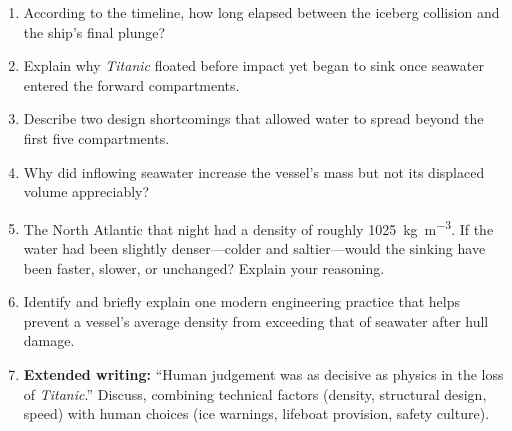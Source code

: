 \documentclass[11pt]{article}
\begin{document}
\begin{enumerate}
\item According to the timeline, how long elapsed between the iceberg collision and the ship’s final plunge?
\item Explain why \textit{Titanic} floated before impact yet began to sink once seawater entered the forward compartments.
\item Describe two design shortcomings that allowed water to spread beyond the first five compartments.
\item Why did inflowing seawater increase the vessel’s mass but not its displaced volume appreciably?
\item The North Atlantic that night had a density of roughly \SI{1025}{\kilogram\per\metre^{3}}. If the water had been slightly denser—colder and saltier—would the sinking have been faster, slower, or unchanged? Explain your reasoning.
\item Identify and briefly explain one modern engineering practice that helps prevent a vessel’s average density from exceeding that of seawater after hull damage.
\item \textbf{Extended writing:} “Human judgement was as decisive as physics in the loss of \textit{Titanic}.” Discuss, combining technical factors (density, structural design, speed) with human choices (ice warnings, lifeboat provision, safety culture).
\end{enumerate}
\end{document}
